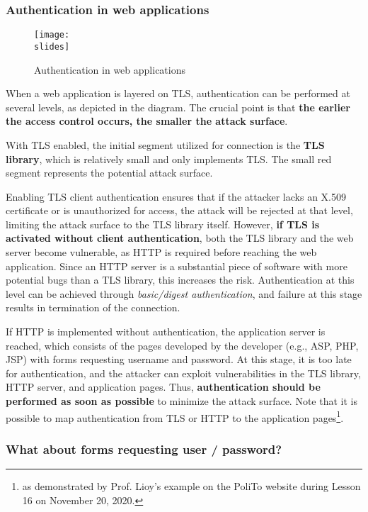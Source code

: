 \subsubsection{Authentication in web applications}
\begin{figure}[h]
    \centering
    \texttt{[image: \\slides]}
    \caption{Authentication in web applications}
\end{figure}

When a web application is layered on TLS, authentication can be performed at several levels, as depicted in the diagram. The crucial point is that \textbf{the earlier the access control occurs, the smaller the attack surface}.

With TLS enabled, the initial segment utilized for connection is the \textbf{TLS library}, which is relatively small and only implements TLS. The small red segment represents the potential attack surface.

Enabling TLS client authentication ensures that if the attacker lacks an X.509 certificate or is unauthorized for access, the attack will be rejected at that level, limiting the attack surface to the TLS library itself. However, \textbf{if TLS is activated without client authentication}, both the TLS library and the web server become vulnerable, as HTTP is required before reaching the web application. Since an HTTP server is a substantial piece of software with more potential bugs than a TLS library, this increases the risk. Authentication at this level can be achieved through \textit{basic/digest authentication}, and failure at this stage results in termination of the connection. 

If HTTP is implemented without authentication, the application server is reached, which consists of the pages developed by the developer (e.g., ASP, PHP, JSP) with forms requesting username and password. At this stage, it is too late for authentication, and the attacker can exploit vulnerabilities in the TLS library, HTTP server, and application pages. Thus, \textbf{authentication should be performed as soon as possible} to minimize the attack surface. Note that it is possible to map authentication from TLS or HTTP to the application pages\footnote{as demonstrated by Prof. Lioy's example on the PoliTo website during Lesson 16 on November 20, 2020.}.



\subsubsection{What about forms requesting user / password?}

